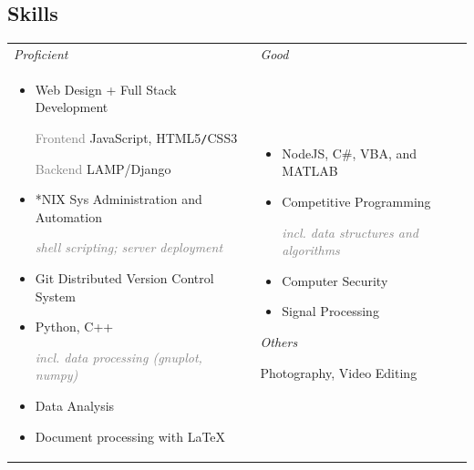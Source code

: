 \documentclass[11pt]{article}
\begin{document}
	\subsection*{Skills}
	\vspace{-\parskip}
		{
			\renewcommand{\arraystretch}{1.5}
			\setlength{\tabcolsep}{12pt}
			\begin{tabularx}{\textwidth}{@{} p{} p{} @{}}
				\textcolor{skiheader}{\textit{Proficient}} & \textcolor{skiheader}{\textit{Good}} \\
				\vspace{-1em}
				\begin{itemize}[leftmargin=3mm]
					\renewcommand\labelitemi{}
					\setlength\itemsep{0.8em}
					\item Web Design + Full Stack Development \par
						\vspace{1mm}
						\hspace{1em} \textcolor{gray}{Frontend} \hfill JavaScript, HTML\textcolor{Bittersweet}{5}\texttt{/}CSS\textcolor{Bittersweet}{3} \par
						\hspace{1em} \textcolor{gray}{Backend} \hfill LAMP/Django 
					\item \**NIX Sys Administration and Automation \par
						\hfill \textcolor{gray}{\footnotesize \itshape shell scripting; server deployment}
					\item Git Distributed Version Control System
					\item Python, C++ \par %
						\hfill \textcolor{gray}{\footnotesize \itshape incl. data processing (gnuplot, numpy)}
					\item Data Analysis
					\item Document processing with{\fontfamily{cmr} \selectfont \LaTeX}
				\end{itemize} & 
				\vspace{-1em}
				\begin{itemize}[leftmargin=3mm]
					\renewcommand\labelitemi{}
					\setlength\itemsep{0.9em}
					\item NodeJS, C\#, VBA, and MATLAB 
					\item Competitive Programming \par
						\hfill \textcolor{gray}{\footnotesize \itshape incl. data structures and algorithms}
					\item Computer Security
					\item Signal Processing
				\end{itemize}
				\vspace{1cm}
				\textcolor{skiheader}{\textit{Others}} \par
				\vspace{1mm}
				\hspace{2mm} Photography, Video Editing 
			\end{tabularx}
		}
\end{document}
